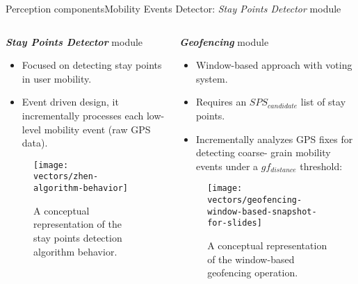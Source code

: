 \begin{frame}{Perception components}{Mobility Events Detector: \emph{Stay Points Detector} module}
\small
\begin{columns}
\begin{column}[T]{0.5\textwidth}
\begin{block}{\small \emph{\textbf{Stay Points Detector}} module}
\begin{itemize}
    \item Focused on detecting stay points in user mobility.
    \item Event driven design, it incrementally processes each low-level mobility event (raw GPS data).
\end{itemize}
\begin{figure}
  \centering
  \texttt{[image: vectors/zhen-algorithm-behavior]}
  \caption{A conceptual representation of the stay points detection algorithm behavior.}
\end{figure}
\end{block}
\end{column}

\begin{column}[T]{0.5\textwidth}
\begin{block}{\small \emph{\textbf{Geofencing}} module}
\begin{itemize}
    \item Window-based approach with voting system.
    \item Requires an $SPS_{candidate}$ list of stay points.
    \item Incrementally analyzes GPS fixes for detecting coarse- grain mobility events under a $gf_{distance}$ threshold:
\end{itemize}

\begin{figure}
  \centering
  \texttt{[image: vectors/geofencing-window-based-snapshot-for-slides]}
  \caption{A conceptual representation of the window-based geofencing operation.}
\end{figure}
\end{block}
\end{column}
\end{columns}


\end{frame}


